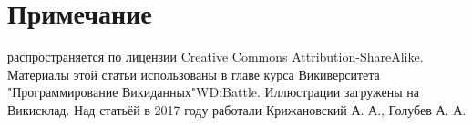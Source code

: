 \section{Примечание}

 распространяется по лицензии Creative Commons Attribution-ShareAlike. Материалы этой статьи использованы в главе курса Викиверситета "Программирование Викиданных"{WD:Battle}. Иллюстрации загружены на Викисклад. Над статьёй в 2017 году работали Крижановский А. А., Голубев А. А.